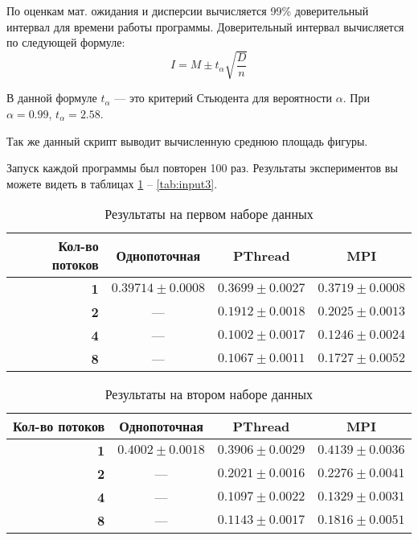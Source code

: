 По оценкам мат. ожидания и дисперсии вычисляется 99\% доверительный интервал для времени работы программы. Доверительный интервал вычисляется по следующей формуле:
\begin{equation*}
I = M \pm t_{\alpha} \sqrt{\frac{D}{n}}
\end{equation*}

В данной формуле $t_{\alpha}$ --- это критерий Стьюдента для вероятности $\alpha$. При $\alpha = 0.99$, $t_{\alpha} = 2.58$. 

Так же данный скрипт выводит вычисленную среднюю площадь фигуры.

Запуск каждой программы был повторен 100 раз. Результаты экспериментов вы можете видеть в таблицах \ref{tab:input1} -- \ref{tab:input3}.

\begin{table}[h!]
\caption{Результаты на первом наборе данных}

\center
\begin{tabular}{|r|c|c|c|}
\hline 
\textbf{Кол-во потоков} & \textbf{Однопоточная} & \textbf{PThread} & \textbf{MPI} \\ 
\hline 
\textbf{1} & $0.39714 \pm 0.0008$ & $0.3699 \pm 0.0027$ & $0.3719 \pm 0.0008$ \\ 
\hline 
\textbf{2} & ---                  & $0.1912 \pm 0.0018$ & $0.2025 \pm 0.0013$ \\ 
\hline 
\textbf{4} & ---                  & \boldmath$0.1002 \pm 0.0017$ & $0.1246 \pm 0.0024$ \\ 
\hline 
\textbf{8} & ---                  & $0.1067 \pm 0.0011$ & $0.1727 \pm 0.0052$ \\ 
\hline 
\end{tabular} 

\label{tab:input1}
\end{table}

\begin{table}[h!]
\caption{Результаты на втором наборе данных}

\center
\begin{tabular}{|r|c|c|c|}
\hline 
\textbf{Кол-во потоков} & \textbf{Однопоточная} & \textbf{PThread} & \textbf{MPI} \\ 
\hline 
\textbf{1} & $0.4002 \pm 0.0018$ & $0.3906 \pm 0.0029$ & $0.4139 \pm 0.0036$ \\ 
\hline 
\textbf{2} & ---                 & $0.2021 \pm 0.0016$ & $0.2276 \pm 0.0041$ \\ 
\hline 
\textbf{4} & ---                 & \boldmath$0.1097 \pm 0.0022$ & $0.1329 \pm 0.0031$ \\ 
\hline 
\textbf{8} & ---                 & $0.1143 \pm 0.0017$ & $0.1816 \pm 0.0051$ \\ 
\hline 
\end{tabular}

\label{tab:input2}
\end{table}

